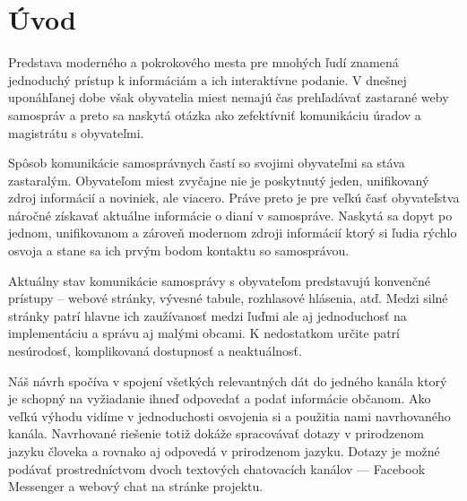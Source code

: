 \documentclass{ExcelAtFIT}
\affiliation{*%
  \href{mailto:xjusko00@stud.fit.vutbr.cz}{xjusko00@stud.fit.vutbr.cz},
  \textit{Faculty of Information Technology, Brno University of Technology}}
\begin{document}
\startdocument



\section{Úvod}

Predstava moderného a pokrokového mesta pre mnohých ľudí znamená jednoduchý prístup k informáciám a ich interaktívne podanie. V dnešnej uponáhľanej dobe však obyvatelia miest nemajú čas prehľadávať zastarané weby samospráv a preto sa naskytá otázka ako zefektívniť komunikáciu úradov a magistrátu s obyvateľmi. 


Spôsob komunikácie samosprávnych častí so svojimi obyvateľmi sa stáva zastaralým. Obyvateľom miest zvyčajne nie je poskytnutý jeden, unifikovaný zdroj informácií a noviniek, ale viacero. Práve preto je pre veľkú časť obyvateľstva náročné získavať aktuálne informácie o dianí v samospráve. Naskytá sa dopyt po jednom, unifikovanom a zároveň modernom zdroji informácií ktorý si ľudia rýchlo osvoja a stane sa ich prvým bodom kontaktu so samosprávou. 

Aktuálny stav komunikácie samosprávy s obyvateľom predstavujú konvenčné prístupy -- webové stránky, vývesné tabule, rozhlasové hlásenia, atď. Medzi silné stránky patrí hlavne ich zaužívanosť medzi ľuďmi ale aj jednoduchosť na implementáciu a správu aj malými obcami. K nedostatkom určite patrí nesúrodosť, komplikovaná dostupnosť a neaktuálnosť.

Náš návrh spočíva v spojení všetkých relevantných dát do jedného kanála ktorý je schopný na vyžiadanie ihneď odpovedať a podať informácie občanom. Ako veľkú výhodu vidíme v jednoduchosti osvojenia si a použitia nami navrhovaného kanála. Navrhované riešenie totiž dokáže spracovávať dotazy v prirodzenom jazyku človeka a rovnako aj odpovedá v prirodzenom jazyku. Dotazy je možné podávať prostredníctvom dvoch textových chatovacích kanálov --- Facebook Messenger a webový chat na stránke projektu.
\end{document}
